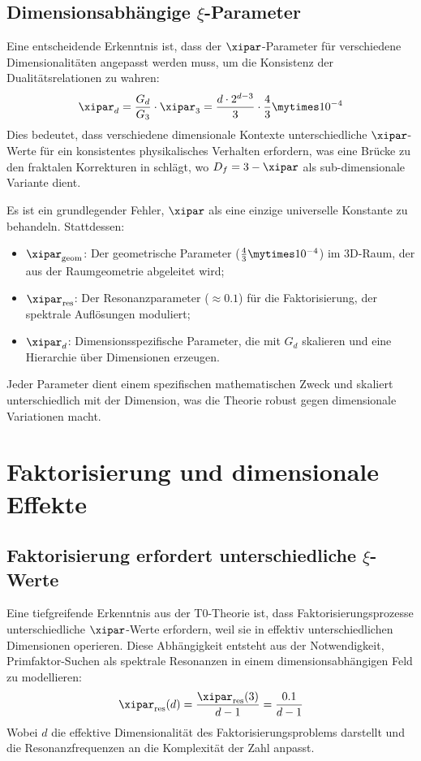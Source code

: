 \subsection{Dimensionsabhängige $\xi$-Parameter}
\label{subsec:dimension_dependent_xi}
Eine entscheidende Erkenntnis ist, dass der $\xipar$-Parameter für verschiedene Dimensionalitäten angepasst werden muss, um die Konsistenz der Dualitätsrelationen zu wahren:
\begin{equation}
	\xipar_d = \frac{G_d}{G_3} \cdot \xipar_3 = \frac{d \cdot 2^{d-3}}{3} \cdot \frac{4}{3} \mytimes 10^{-4}
\end{equation}
Dies bedeutet, dass verschiedene dimensionale Kontexte unterschiedliche $\xipar$-Werte für ein konsistentes physikalisches Verhalten erfordern, was eine Brücke zu den fraktalen Korrekturen in \cite{T0_g2_erweiterung} schlägt, wo $D_f = 3 - \xipar$ als sub-dimensionale Variante dient.
\begin{revolutionary}
	Es ist ein grundlegender Fehler, $\xipar$ als eine einzige universelle Konstante zu behandeln. Stattdessen:
	\begin{itemize}
		\item $\xipar_{\text{geom}}$: Der geometrische Parameter ($\frac{4}{3} \mytimes 10^{-4}$) im 3D-Raum, der aus der Raumgeometrie abgeleitet wird;
		\item $\xipar_{\text{res}}$: Der Resonanzparameter ($\approx 0.1$) für die Faktorisierung, der spektrale Auflösungen moduliert;
		\item $\xipar_d$: Dimensionsspezifische Parameter, die mit $G_d$ skalieren und eine Hierarchie über Dimensionen erzeugen.
	\end{itemize}
	Jeder Parameter dient einem spezifischen mathematischen Zweck und skaliert unterschiedlich mit der Dimension, was die Theorie robust gegen dimensionale Variationen macht.
\end{revolutionary}
\section{Faktorisierung und dimensionale Effekte}
\label{sec:factorization_dimensional}
\subsection{Faktorisierung erfordert unterschiedliche $\xi$-Werte}
\label{subsec:factorization_xi}
Eine tiefgreifende Erkenntnis aus der T0-Theorie ist, dass Faktorisierungsprozesse unterschiedliche $\xipar$-Werte erfordern, weil sie in effektiv unterschiedlichen Dimensionen operieren. Diese Abhängigkeit entsteht aus der Notwendigkeit, Primfaktor-Suchen als spektrale Resonanzen in einem dimensionsabhängigen Feld zu modellieren:
\begin{equation}
	\xipar_{\text{res}}(d) = \frac{\xipar_{\text{res}}(3)}{d-1} = \frac{0.1}{d-1}
\end{equation}
Wobei $d$ die effektive Dimensionalität des Faktorisierungsproblems darstellt und die Resonanzfrequenzen an die Komplexität der Zahl anpasst.

